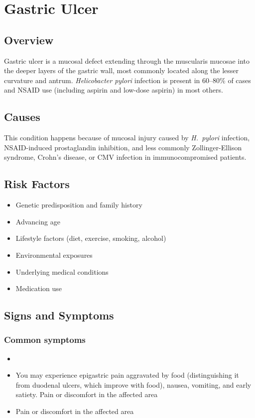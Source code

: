 \chapter{Gastric Ulcer}
\label{sec:Gastric Ulcer}

\section{Overview}
Gastric ulcer is a mucosal defect extending through the muscularis mucosae into the deeper layers of the gastric wall, most commonly located along the lesser curvature and antrum. \textit{Helicobacter pylori} infection is present in 60--80\% of cases and NSAID use (including aspirin and low-dose aspirin) in most others.
\section{Causes}
This condition happens because of mucosal injury caused by \textit{H.~pylori} infection, NSAID-induced prostaglandin inhibition, and less commonly Zollinger-Ellison syndrome, Crohn's disease, or CMV infection in immunocompromised patients.     
\section{Risk Factors}

\begin{itemize}[noitemsep]
  \item Genetic predisposition and family history
  \item Advancing age
  \item Lifestyle factors (diet, exercise, smoking, alcohol)
  \item Environmental exposures
  \item Underlying medical conditions
  \item Medication use
\end{itemize}
\section{Signs and Symptoms}

\subsection{Common symptoms}
\begin{itemize}[noitemsep]
  \item \item You may experience epigastric pain aggravated by food (distinguishing it from duodenal ulcers, which improve with food), nausea, vomiting, and early satiety. Pain or discomfort in the affected area    \item Pain or discomfort in the affected area
  \end{itemize}

